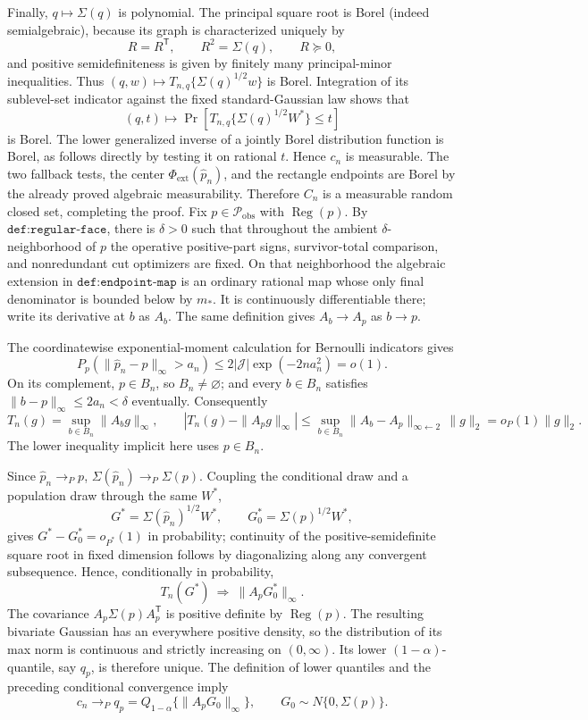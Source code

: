 Finally, \(q\mapsto\Sigma(q)\) is polynomial.  The principal square root is Borel (indeed semialgebraic), because its graph is characterized uniquely by
\[
R=R^{\mathsf T},\qquad R^2=\Sigma(q),\qquad R\succeq0,
\]
and positive semidefiniteness is given by finitely many principal-minor inequalities.  Thus \((q,w)\mapsto T_{n,q}\{\Sigma(q)^{1/2}w\}\) is Borel.  Integration of its sublevel-set indicator against the fixed standard-Gaussian law shows that
\[
(q,t)\longmapsto
\Pr\!\left[T_{n,q}\{\Sigma(q)^{1/2}W^*\}\le t\right]
\]
is Borel.  The lower generalized inverse of a jointly Borel distribution function is Borel, as follows directly by testing it on rational \(t\).  Hence \(c_n\) is measurable.  The two fallback tests, the center \(\Phi_{\mathrm{ext}}(\widehat p_n)\), and the rectangle endpoints are Borel by the already proved algebraic measurability.  Therefore \(C_n\) is a measurable random closed set, completing the proof.
Fix \(p\in\mathcal P_{\mathrm{obs}}\) with \(\operatorname{Reg}(p)\).  By \(\texttt{def:regular-face}\), there is \(\delta>0\) such that throughout the ambient \(\delta\)-neighborhood of \(p\) the operative positive-part signs, survivor-total comparison, and nonredundant cut optimizers are fixed.  On that neighborhood the algebraic extension in \(\texttt{def:endpoint-map}\) is an ordinary rational map whose only final denominator is bounded below by \(m_*\).  It is continuously differentiable there; write its derivative at \(b\) as \(A_b\).  The same definition gives \(A_b\to A_p\) as \(b\to p\).

The coordinatewise exponential-moment calculation for Bernoulli indicators gives
\[
P_p\!\left(\|\widehat p_n-p\|_\infty>a_n\right)
\le 2|\mathcal J|\exp(-2na_n^2)=o(1).
\]
On its complement, \(p\in B_n\), so \(B_n\ne\varnothing\); and every \(b\in B_n\) satisfies \(\|b-p\|_\infty\le2a_n<\delta\) eventually.  Consequently
\[
T_n(g)=\sup_{b\in B_n}\|A_bg\|_\infty,
\qquad
\left|T_n(g)-\|A_pg\|_\infty\right|
\le \sup_{b\in B_n}\|A_b-A_p\|_{\infty\leftarrow2}\,\|g\|_2=o_P(1)\|g\|_2.
\]
The lower inequality implicit here uses \(p\in B_n\).

Since \(\widehat p_n\to_Pp\), \(\Sigma(\widehat p_n)\to_P\Sigma(p)\).  Coupling the conditional draw and a population draw through the same \(W^*\),
\[
G^*=\Sigma(\widehat p_n)^{1/2}W^*,
\qquad
G_0^*=\Sigma(p)^{1/2}W^*,
\]
gives \(G^*-G_0^*=o_{P^*}(1)\) in probability; continuity of the positive-semidefinite square root in fixed dimension follows by diagonalizing along any convergent subsequence.  Hence, conditionally in probability,
\[
T_n(G^*)\ \Rightarrow\ \|A_pG_0^*\|_\infty.
\]
The covariance \(A_p\Sigma(p)A_p^{\mathsf T}\) is positive definite by \(\operatorname{Reg}(p)\).  The resulting bivariate Gaussian has an everywhere positive density, so the distribution of its max norm is continuous and strictly increasing on \((0,\infty)\).  Its lower \((1-\alpha)\)-quantile, say \(q_p\), is therefore unique.  The definition of lower quantiles and the preceding conditional convergence imply
\[
c_n\to_Pq_p=Q_{1-\alpha}\{\|A_pG_0\|_\infty\},
\qquad G_0\sim N\{0,\Sigma(p)\}.
\]


